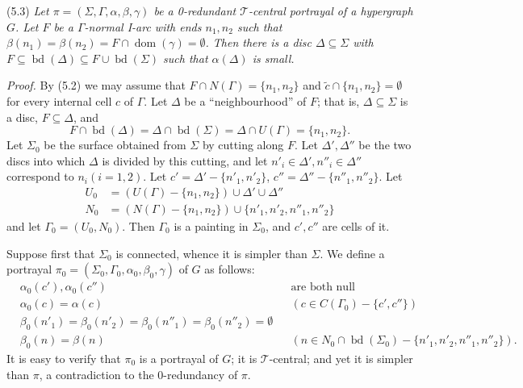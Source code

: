\stmt
(5.3) \textit{Let $\pi = (\Sigma, \Gamma, \alpha, \beta, \gamma)$ be a 0-redundant $\mathscr{T}$-central portrayal of a hypergraph $G$. Let $F$ be a $\Gamma$-normal I-arc with ends $n_1, n_2$ such that $\beta(n_1) = \beta(n_2) = F \cap \operatorname{dom}(\gamma) = \emptyset$. Then there is a disc $\Delta \subseteq \Sigma$ with $F \subseteq \operatorname{bd}(\Delta) \subseteq F \cup \operatorname{bd}(\Sigma)$ such that $\alpha(\Delta)$ is small.}

\textit{Proof.} By (5.2) we may assume that $F \cap N(\Gamma) = \{n_1, n_2\}$ and $\tilde{c} \cap \{n_1, n_2\} = \emptyset$ for every internal cell $c$ of $\Gamma$. Let $\Delta$ be a ``neighbourhood'' of $F$; that is, $\Delta \subseteq \Sigma$ is a disc, $F \subseteq \Delta$, and
\begin{equation*}
F \cap \operatorname{bd}(\Delta) = \Delta \cap \operatorname{bd}(\Sigma) = \Delta \cap U(\Gamma) = \{n_1, n_2\}.
\end{equation*}
Let $\Sigma_0$ be the surface obtained from $\Sigma$ by cutting along $F$. Let $\Delta', \Delta''$ be the two discs into which $\Delta$ is divided by this cutting, and let $n'_i \in \Delta', n''_i \in \Delta''$ correspond to $n_i (i = 1, 2)$. Let $c' = \Delta' - \{n'_1, n'_2\}$, $c'' = \Delta'' - \{n''_1, n''_2\}$. Let
\begin{align*}
U_0 &= (U(\Gamma) - \{n_1, n_2\}) \cup \Delta' \cup \Delta'' \\
N_0 &= (N(\Gamma) - \{n_1, n_2\}) \cup \{n'_1, n'_2, n''_1, n''_2\}
\end{align*}
and let $\Gamma_0 = (U_0, N_0)$. Then $\Gamma_0$ is a painting in $\Sigma_0$, and $c', c''$ are cells of it.

Suppose first that $\Sigma_0$ is connected, whence it is simpler than $\Sigma$. We define a portrayal $\pi_0 = (\Sigma_0, \Gamma_0, \alpha_0, \beta_0, \gamma)$ of $G$ as follows:
\begin{align*}
&\alpha_0(c'), \alpha_0(c'') &&\text{are both null} \\
&\alpha_0(c) = \alpha(c) &&(c \in C(\Gamma_0) - \{c', c''\}) \\
&\beta_0(n'_1) = \beta_0(n'_2) = \beta_0(n''_1) = \beta_0(n''_2) = \emptyset \\
&\beta_0(n) = \beta(n) &&(n \in N_0 \cap \operatorname{bd}(\Sigma_0) - \{n'_1, n'_2, n''_1, n''_2\}).
\end{align*}
It is easy to verify that $\pi_0$ is a portrayal of $G$; it is $\mathscr{T}$-central; and yet it is simpler than $\pi$, a contradiction to the 0-redundancy of $\pi$.

